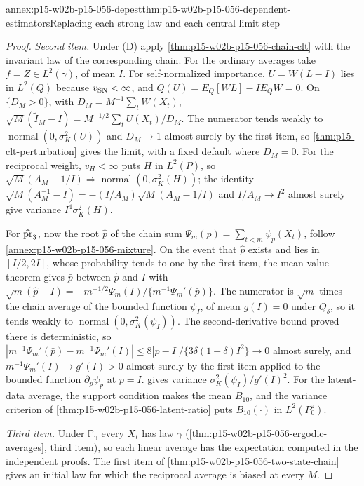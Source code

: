 \begin{annexitem}{annex:p15-w02b-p15-056-depest}{thm:p15-w02b-p15-056-dependent-estimators}{Replacing each strong law and each central limit step}
\begin{proof}
\emph{Second item.} Under (D) apply
\cref{thm:p15-w02b-p15-056-chain-clt} with the invariant law of the
corresponding chain. For the ordinary averages take \(f=Z\in L^2(\gamma)\),
of mean \(I\). For self-normalized importance, \(U=W(L-I)\) lies in
\(L^2(Q)\) because \(v_{\rm SN}<\infty\), and
\(Q(U)=E_Q[WL]-IE_QW=0\). On \(\{D_M>0\}\), with
\(D_M=M^{-1}\sum_tW(X_t)\),
\(\sqrt M(\widetilde I_M-I)=M^{-1/2}\sum_tU(X_t)/D_M\). The numerator
tends weakly to \(\operatorname{normal}(0,\sigma^2_K(U))\) and \(D_M\to1\)
almost surely by the first item, so \cref{thm:p15-clt-perturbation} gives
the limit, with a fixed default where \(D_M=0\). For the reciprocal
weight, \(v_H<\infty\) puts \(H\) in \(L^2(P)\), so
\(\sqrt M(A_M-1/I)\Rightarrow\operatorname{normal}(0,\sigma^2_K(H))\); the
identity \(\sqrt M(A_M^{-1}-I)=-(I/A_M)\sqrt M(A_M-1/I)\) and
\(I/A_M\to I^2\) almost surely give variance \(I^4\sigma^2_K(H)\).

For \(\widehat{\rm pr}_3\), now the root \(\widehat p\) of
the chain sum \(\Psi_m(p)=\sum_{t<m}\psi_p(X_t)\), follow
\cref{annex:p15-w02b-p15-056-mixture}. On the event that
\(\widehat p\) exists and lies in \([I/2,2I]\), whose probability tends to
one by the first item, the mean value theorem gives \(\bar p\) between
\(\widehat p\) and \(I\) with
\(\sqrt m(\widehat p-I)=-m^{-1/2}\Psi_m(I)/\{m^{-1}\Psi_m'(\bar p)\}\).
The numerator is \(\sqrt m\) times the chain average of the bounded
function \(\psi_I\), of mean \(g(I)=0\) under \(Q_\delta\), so it tends
weakly to \(\operatorname{normal}(0,\sigma^2_K(\psi_I))\). The
second-derivative bound proved there is deterministic, so
\(|m^{-1}\Psi_m'(\bar p)-m^{-1}\Psi_m'(I)|\leq8|\widehat p-I|/\{3\delta(1-\delta)I^2\}\to0\)
almost surely, and \(m^{-1}\Psi_m'(I)\to g'(I)>0\) almost surely by the
first item applied to the bounded function \(\partial_p\psi_p\) at
\(p=I\).  gives variance
\(\sigma^2_K(\psi_I)/g'(I)^2\). For the latent-data average, the support
condition makes the mean \(B_{10}\), and the variance criterion of
\cref{thm:p15-w02b-p15-056-latent-ratio} puts \(B_{10}(\cdot)\) in
\(L^2(P^z_0)\).

\emph{Third item.} Under \(\mathbb P_\gamma\) every \(X_t\) has law
\(\gamma\) (\cref{thm:p15-w02b-p15-056-ergodic-averages}, third item), so
each linear average has the expectation computed in the independent
proofs. The first item of \cref{thm:p15-w02b-p15-056-two-state-chain}
gives an initial law for which the reciprocal average is biased at every
\(M\).
\end{proof}
\end{annexitem}

